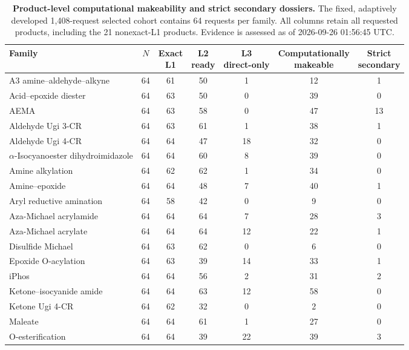 \begin{table}[H]
\caption{\textbf{Product-level computational makeability and strict secondary dossiers.} The fixed, adaptively developed 1,408-request selected cohort contains 64 requests per family. All columns retain all requested products, including the 21 nonexact-L1 products. Evidence is assessed as of 2026-09-26 01:56:45 UTC.}
\label{tab:22-routes}
\centering\footnotesize\setlength{\tabcolsep}{3pt}\renewcommand{\arraystretch}{1.10}
\begin{tabular}{@{}>{\raggedright\arraybackslash}p{}cccccc@{}}
\toprule
Family & $N$ & \shortstack{Exact\\L1} & \shortstack{L2\\ready} & \shortstack{L3\\direct-only} & \shortstack{Computationally\\makeable} & \shortstack{Strict\\secondary} \\
\midrule
A3 amine--aldehyde--alkyne & 64 & 61 & 50 & 1 & 12 & 1 \\
Acid--epoxide diester & 64 & 63 & 50 & 0 & 39 & 0 \\
AEMA & 64 & 63 & 58 & 0 & 47 & 13 \\
Aldehyde Ugi 3-CR & 64 & 63 & 61 & 1 & 38 & 1 \\
Aldehyde Ugi 4-CR & 64 & 64 & 47 & 18 & 32 & 0 \\
$\alpha$-Isocyanoester dihydroimidazole & 64 & 64 & 60 & 8 & 39 & 0 \\
Amine alkylation & 64 & 62 & 62 & 1 & 34 & 0 \\
Amine--epoxide & 64 & 64 & 48 & 7 & 40 & 1 \\
Aryl reductive amination & 64 & 58 & 42 & 0 & 9 & 0 \\
Aza-Michael acrylamide & 64 & 64 & 64 & 7 & 28 & 3 \\
Aza-Michael acrylate & 64 & 64 & 64 & 12 & 22 & 1 \\
Disulfide Michael & 64 & 63 & 62 & 0 & 6 & 0 \\
Epoxide O-acylation & 64 & 63 & 39 & 14 & 33 & 1 \\
iPhos & 64 & 64 & 56 & 2 & 31 & 2 \\
Ketone--isocyanide amide & 64 & 64 & 63 & 12 & 58 & 0 \\
Ketone Ugi 4-CR & 64 & 62 & 32 & 0 & 2 & 0 \\
Maleate & 64 & 64 & 61 & 1 & 27 & 0 \\
O-esterification & 64 & 64 & 39 & 22 & 39 & 3 \\

\end{tabular}
\end{table}
